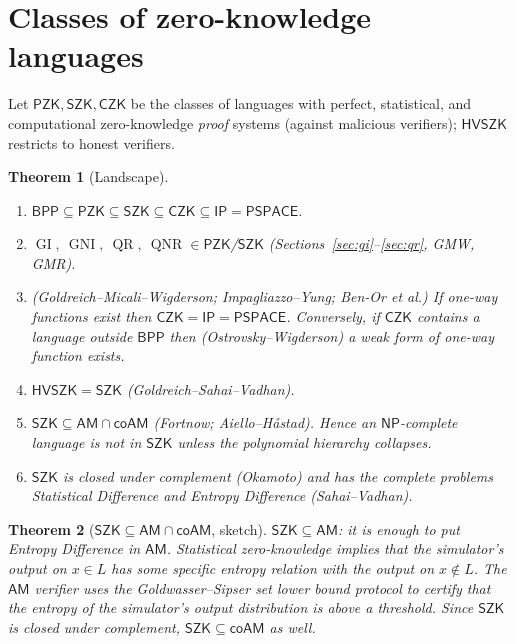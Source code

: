 \documentclass[11pt,a4paper]{report}
\newcommand{\prob}[1]{\textsf{#1}}
\theoremstyle{plain}
\newtheorem{theorem}{Theorem}[chapter]
\theoremstyle{definition}
\theoremstyle{remark}
\newcommand{\NP}{\mathsf{NP}}\newcommand{\BPP}{\mathsf{BPP}}\newcommand{\IP}{\mathsf{IP}}
\newcommand{\PSPACE}{\mathsf{PSPACE}}\newcommand{\AM}{\mathsf{AM}}\newcommand{\coAM}{\mathsf{coAM}}
\newcommand{\SZK}{\mathsf{SZK}}\newcommand{\CZK}{\mathsf{CZK}}\newcommand{\PZK}{\mathsf{PZK}}
\newcommand{\HVSZK}{\mathsf{HVSZK}}
\DeclareMathOperator{\GI}{GI}\DeclareMathOperator{\GNI}{GNI}
\DeclareMathOperator{\QR}{QR}\DeclareMathOperator{\QNR}{QNR}
\begin{document}
\section{Classes of zero-knowledge languages}
Let $\PZK,\SZK,\CZK$ be the classes of languages with perfect, statistical, and computational zero-knowledge \emph{proof} systems (against malicious verifiers); $\HVSZK$ restricts to honest verifiers.
\begin{theorem}[Landscape]\label{thm:landscape}
\begin{enumerate}
\item $\BPP\subseteq\PZK\subseteq\SZK\subseteq\CZK\subseteq\IP=\PSPACE$.
\item $\GI,\ \GNI,\ \QR,\ \QNR\in\PZK$/$\SZK$ (Sections~\ref{sec:gi}--\ref{sec:qr}, GMW, GMR).
\item (Goldreich--Micali--Wigderson; Impagliazzo--Yung; Ben-Or et al.) If one-way functions exist then $\CZK=\IP=\PSPACE$. Conversely, if $\CZK$ contains a language outside $\BPP$ then (Ostrovsky--Wigderson) a weak form of one-way function exists.
\item $\HVSZK=\SZK$ (Goldreich--Sahai--Vadhan).
\item $\SZK\subseteq\AM\cap\coAM$ (Fortnow; Aiello--H{\aa}stad). Hence an $\NP$-complete language is not in $\SZK$ unless the polynomial hierarchy collapses.
\item $\SZK$ is closed under complement (Okamoto) and has the complete problems \prob{Statistical Difference} and \prob{Entropy Difference} (Sahai--Vadhan).
\end{enumerate}
\end{theorem}
\begin{center}
\end{center}
\begin{theorem}[$\SZK\subseteq\AM\cap\coAM$, sketch]\label{thm:szkam}
$\SZK\subseteq\AM$: it is enough to put \prob{Entropy Difference} in $\AM$. Statistical zero-knowledge implies that the simulator's output on $x\in L$ has some specific entropy relation with the output on $x\notin L$. The $\AM$ verifier uses the Goldwasser--Sipser set lower bound protocol to certify that the entropy of the simulator's output distribution is above a threshold. Since $\SZK$ is closed under complement, $\SZK\subseteq\coAM$ as well.
\end{theorem}
\end{document}
